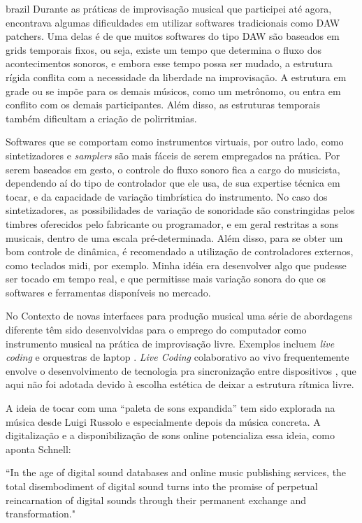 \begin{otherlanguage*}{brazil}
Durante as práticas de improvisação musical que participei até agora, encontrava algumas dificuldades em utilizar softwares tradicionais como DAW patchers. Uma delas é de que muitos softwares do tipo DAW são baseados em grids temporais fixos, ou seja, existe um tempo que determina o fluxo dos acontecimentos sonoros, e embora esse tempo possa ser mudado, a estrutura rígida conflita com a necessidade da liberdade na improvisação. A estrutura em grade ou se impõe para os demais músicos, como um metrônomo, ou entra em conflito com os demais participantes. Além disso, as estruturas temporais também dificultam a criação de polirritmias. 

Softwares que se comportam como instrumentos virtuais, por outro lado, como sintetizadores e \emph{samplers} são mais fáceis de serem empregados na prática. Por serem baseados em gesto, o controle do fluxo sonoro fica a cargo do musicista, dependendo aí do tipo de controlador que ele usa, de sua expertise técnica em tocar, e da capacidade de variação timbrística do instrumento. No caso dos sintetizadores, as possibilidades de variação de sonoridade são constringidas pelos timbres oferecidos pelo fabricante ou programador, e em geral restritas a sons musicais, dentro de uma escala pré-determinada. Além disso, para se obter um bom controle de dinâmica, é recomendado a utilização de controladores externos, como teclados midi, por exemplo. Minha idéia era desenvolver algo que pudesse ser tocado em tempo real, e que permitisse mais variação sonora do que os softwares e ferramentas disponíveis no mercado.

No Contexto de novas interfaces para produção musical uma série de abordagens diferente têm sido desenvolvidas para o emprego do computador como instrumento musical na prática de improvisação livre. Exemplos incluem \emph{live coding} \cite{freeman2011collaborative} e orquestras de laptop \cite{Albert2012}. \emph{Live Coding} colaborativo ao vivo frequentemente envolve o desenvolvimento de tecnologia pra sincronização entre dispositivos \cite{Wilson2014}, que aqui não foi adotada devido à escolha estética de deixar a estrutura rítmica livre.


A ideia de tocar com uma ``paleta de sons expandida'' tem sido explorada na música desde Luigi Russolo  \cite{Merz2013} e especialmente depois da música concreta. A digitalização e a disponibilização de sons online potencializa essa ideia, como aponta Schnell:
\begin{citacao}
``In the age of digital sound databases and online music publishing services, the total disembodiment of digital sound turns into the promise of perpetual reincarnation of digital sounds through their permanent exchange and transformation."\cite{Schnell2013}
\end{citacao}


\end{otherlanguage*}
